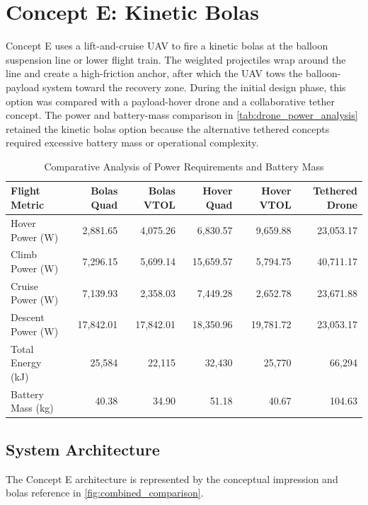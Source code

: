 \section{Concept E: Kinetic Bolas}  
Concept E uses a lift-and-cruise UAV to fire a kinetic bolas at the
balloon suspension line or lower flight train. The weighted projectiles
wrap around the line and create a high-friction anchor, after which the
UAV tows the balloon-payload system toward the recovery zone. During the
initial design phase, this option was compared with a payload-hover
drone and a collaborative tether concept. The power and battery-mass
comparison in \autoref{tab:drone_power_analysis} retained the kinetic
bolas option because the alternative tethered concepts required
excessive battery mass or operational complexity.

\begin{table}[H]
\centering
\caption{Comparative Analysis of Power Requirements and Battery Mass}
\label{tab:drone_power_analysis}
\begin{tabular}{lrrrrr}
\toprule
\textbf{Flight Metric} & \textbf{Bolas Quad} & \textbf{Bolas VTOL} & \textbf{Hover Quad} & \textbf{Hover VTOL} & \textbf{Tethered Drone} \\
\midrule
Hover Power (W)    & 2,881.65  & 4,075.26  & 6,830.57  & 9,659.88  & 23,053.17 \\
Climb Power (W)    & 7,296.15  & 5,699.14  & 15,659.57 & 5,794.75  & 40,711.17 \\
Cruise Power (W)  & 7,139.93  & 2,358.03  & 7,449.28  & 2,652.78  & 23,671.88 \\
Descent Power (W) & 17,842.01 & 17,842.01 & 18,350.96 & 19,781.72 & 23,053.17 \\
\midrule
Total Energy (kJ)  & 25,584    & 22,115    & 32,430    & 25,770    & 66,294    \\
Battery Mass (kg) & 40.38     & 34.90     & 51.18     & 40.67     & 104.63    \\
\bottomrule
\end{tabular}
\end{table}

\subsection{System Architecture}
\label{subsec:concept_E_architecture}
The Concept E architecture is represented by the conceptual impression
and bolas reference in \autoref{fig:combined_comparison}.

